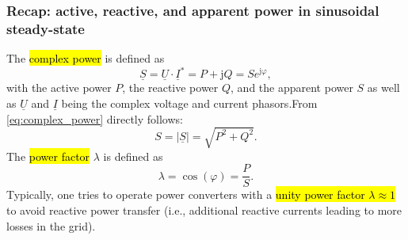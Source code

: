 \begin{frame}
    \frametitle{Recap: active, reactive, and apparent power in sinusoidal steady-state}
    The \hl{complex power} is defined as
    \begin{equation}
        \underline{S} = \underline{U} \cdot \underline{I}^* = P + \mathrm{j}Q = S e^{ \mathrm{j} \varphi},
        \label{eq:complex_power}
    \end{equation}
    with the active power $P$, the reactive power $Q$, and the apparent power $S$ as well as $\underline{U}$ and $\underline{I}$ being the complex voltage and current phasors.\pause From \eqref{eq:complex_power} directly follows:
    \begin{equation}
        S = |\underline{S}| = \sqrt{P^2 + Q^2}.
    \end{equation}\pause
    The \hl{power factor} $\lambda$ is defined as
    \begin{equation}
        \lambda =\cos(\varphi) = \frac{P}{S}.
    \end{equation}\pause
    Typically, one tries to operate power converters with a \hl{unity power factor $\lambda \approx 1$} to avoid reactive power transfer (i.e., additional reactive currents leading to more losses in the grid).
\end{frame}

